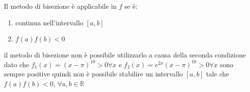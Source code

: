 Il metodo di bisezione è applicabile in $f$ se è:
\begin{enumerate}
\item continua nell'intervallo $[a,b]$
\item $f(a)f(b)<0$
\end{enumerate}

\begin{flushleft}
il metodo di bisezione non è possibile utilizzarlo a causa della seconda condizione dato che $f_1(x)=(x-\pi)^{10}>0 \forall x$ e $f_2(x)=e^{2x}(x-\pi)^{10}>0 \forall x$ sono sempre positive quindi non è possibile stabilire un intervallo $[a,b]$ tale che $f(a)f(b)<0$, $\forall a,b \in \mathbb{R}$
\end{flushleft}
 

